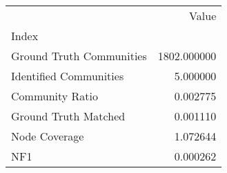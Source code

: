 \begin{tabular}{lr}
\toprule
{} &        Value \\
Index                    &              \\
\midrule
Ground Truth Communities &  1802.000000 \\
Identified Communities   &     5.000000 \\
Community Ratio          &     0.002775 \\
Ground Truth Matched     &     0.001110 \\
Node Coverage            &     1.072644 \\
NF1                      &     0.000262 \\
\bottomrule
\end{tabular}

